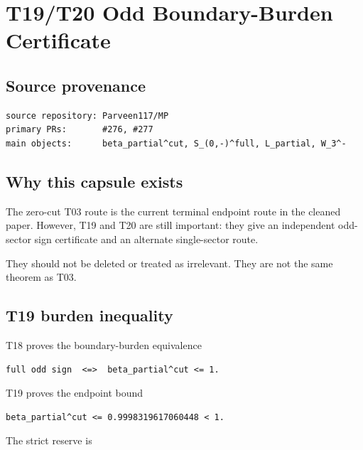\hypertarget{t19t20-odd-boundary-burden-certificate}{%
\chapter{T19/T20 Odd Boundary-Burden Certificate}\label{t19t20-odd-boundary-burden-certificate}}

\hypertarget{source-provenance}{%
\section{Source provenance}\label{source-provenance}}

\begin{verbatim}
source repository: Parveen117/MP
primary PRs:       #276, #277
main objects:      beta_partial^cut, S_(0,-)^full, L_partial, W_3^-
\end{verbatim}

\hypertarget{why-this-capsule-exists}{%
\section{Why this capsule exists}\label{why-this-capsule-exists}}

The zero-cut T03 route is the current terminal endpoint route in the cleaned paper. However, T19 and T20 are still important: they give an independent odd-sector sign certificate and an alternate single-sector route.

They should not be deleted or treated as irrelevant. They are not the same theorem as T03.

\hypertarget{t19-burden-inequality}{%
\section{T19 burden inequality}\label{t19-burden-inequality}}

T18 proves the boundary-burden equivalence

\begin{verbatim}
full odd sign  <=>  beta_partial^cut <= 1.
\end{verbatim}

T19 proves the endpoint bound

\begin{verbatim}
beta_partial^cut <= 0.9998319617060448 < 1.
\end{verbatim}

The strict reserve is

